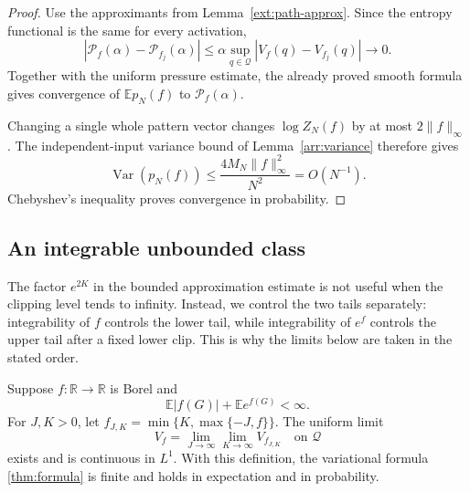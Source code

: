 \begin{proof}
Use the approximants from Lemma~\ref{ext:path-approx}. Since the entropy
functional is the same for every activation,
\[
 |\mathcal P_f(\alpha)-\mathcal P_{f_j}(\alpha)|
 \le\alpha\sup_{q\in\mathcal Q}|V_f(q)-V_{f_j}(q)|\longrightarrow0.
\]
Together with the uniform pressure estimate, the already proved smooth
formula gives convergence of $\mathbb E p_N(f)$ to
$\mathcal P_f(\alpha)$.

Changing a single whole pattern vector changes $\log Z_N(f)$ by at most
$2\|f\|_\infty$. The independent-input variance bound of
Lemma~\ref{arr:variance} therefore gives
\begin{equation}\label{ext:concentration}
 \operatorname{Var}(p_N(f))\le
 \frac{4M_N\|f\|_\infty^2}{N^2}=O(N^{-1}).
\end{equation}
Chebyshev's inequality proves convergence in probability.
\end{proof}

\subsection{An integrable unbounded class}

The factor $e^{2K}$ in the bounded approximation estimate is not useful
when the clipping level tends to infinity. Instead, we control the two
tails separately: integrability of $f$ controls the lower tail, while
integrability of $e^f$ controls the upper tail after a fixed lower clip.
This is why the limits below are taken in the stated order.

\begin{theorem}\label{ext:integrable}
Suppose $f:\mathbb R\to\mathbb R$ is Borel and
\begin{equation}\label{ext:moments}
 \mathbb E|f(G)|+\mathbb E e^{f(G)}<\infty.
\end{equation}
For $J,K>0$, let $f_{J,K}=\min\{K,\max\{-J,f\}\}$. The uniform limit
\begin{equation}\label{ext:unbounded-V}
 V_f=\lim_{J\to\infty}\lim_{K\to\infty}V_{f_{J,K}}
 \quad\text{on }\mathcal Q
\end{equation}
exists and is continuous in $L^1$. With this definition, the variational
formula \eqref{thm:formula} is finite and holds in expectation and in
probability.
\end{theorem}

